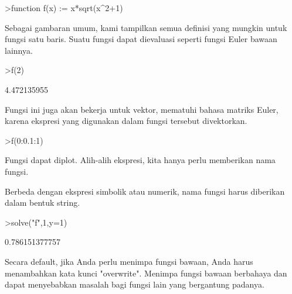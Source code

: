 \documentclass[a4paper,10pt]{article}
\begin{document}
\begin{eulernotebook}
\begin{eulercomment}
\begin{eulercomment}
\begin{eulercomment}
\begin{eulercomment}
\begin{eulerprompt}
>function f(x) := x*sqrt(x^2+1)
\end{eulerprompt}
\begin{eulercomment}
Sebagai gambaran umum, kami tampilkan semua definisi yang mungkin
untuk fungsi satu baris. Suatu fungsi dapat dievaluasi seperti fungsi
Euler bawaan lainnya.
\end{eulercomment}
\begin{eulerprompt}
>f(2)
\end{eulerprompt}
\begin{euleroutput}
  4.472135955
\end{euleroutput}
\begin{eulercomment}
Fungsi ini juga akan bekerja untuk vektor, mematuhi bahasa matriks
Euler, karena ekspresi yang digunakan dalam fungsi tersebut
divektorkan.
\end{eulercomment}
\begin{eulerprompt}
>f(0:0.1:1)
\end{eulerprompt}
\begin{euleroutput}
  [0,  0.100499,  0.203961,  0.313209,  0.430813,  0.559017,  0.699714,
  0.854459,  1.0245,  1.21083,  1.41421]
\end{euleroutput}
\begin{eulercomment}
Fungsi dapat diplot. Alih-alih ekspresi, kita hanya perlu memberikan
nama fungsi.

Berbeda dengan ekspresi simbolik atau numerik, nama fungsi harus
diberikan dalam bentuk string.
\end{eulercomment}
\begin{eulerprompt}
>solve("f",1,y=1)
\end{eulerprompt}
\begin{euleroutput}
  0.786151377757
\end{euleroutput}
\begin{eulercomment}
Secara default, jika Anda perlu menimpa fungsi bawaan, Anda harus
menambahkan kata kunci "overwrite". Menimpa fungsi bawaan berbahaya
dan dapat menyebabkan masalah bagi fungsi lain yang bergantung
padanya.


\end{eulercomment}
\end{eulercomment}
\end{eulercomment}
\end{eulercomment}
\end{eulercomment}
\end{eulernotebook}
\end{document}
